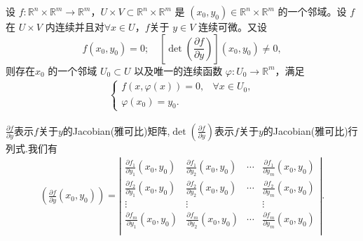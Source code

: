 \documentclass[../../main.tex]{subfiles}%
\begin{document}
\begin{theorem}[隐函数存在定理]\label{theorem:隐函数存在定理}
设 \( f : \mathbb{R}^n \times \mathbb{R}^m \to \mathbb{R}^m \)，\( U \times V \subset \mathbb{R}^n \times \mathbb{R}^m \) 是 \( (x_0, y_0) \in \mathbb{R}^n \times \mathbb{R}^m \) 的一个邻域。设 \( f \) 在 \( U \times V \) 内连续并且对\( \forall x \in U \)，$f$关于 \( y \in V \) 连续可微。又设
\[
f(x_0, y_0) = 0; \quad \left[ \det \left( \frac{\partial f}{\partial y} \right) \right] (x_0, y_0) \neq 0,
\]
则存在\( x_0 \) 的一个邻域 \( U_0 \subset U \) 以及唯一的连续函数 \( \varphi : U_0 \to \mathbb{R}^m \)，满足
\begin{align}\label{eq::hjr2389jr8jHSAIOUFh}
\begin{cases} 
f(x, \varphi(x)) = 0 ,&\forall x \in U_0, \\
\varphi(x_0) = y_0.
\end{cases}
\end{align}
\end{theorem}
\begin{remark}
$\frac{\partial f}{\partial y}$表示$f$关于$y$的Jacobian(雅可比)矩阵,$\det \left( \frac{\partial f}{\partial y} \right)$表示$f$关于$y$的Jacobian(雅可比)行列式.我们有
\begin{align*}
\left( \frac{\partial f}{\partial y}(x_0,y_0)\right) =\left| \begin{matrix}
\frac{\partial f_1}{\partial y_1}\left( x_0,y_0 \right)&		\frac{\partial f_1}{\partial y_2}\left( x_0,y_0 \right)&		\cdots&		\frac{\partial f_1}{\partial y_m}\left( x_0,y_0 \right)\\
\frac{\partial f_2}{\partial y_1}\left( x_0,y_0 \right)&		\frac{\partial f_2}{\partial y_2}\left( x_0,y_0 \right)&		\cdots&		\frac{\partial f_2}{\partial y_m}\left( x_0,y_0 \right)\\
\vdots&		\vdots&		&		\vdots\\
\frac{\partial f_m}{\partial y_1}\left( x_0,y_0 \right)&		\frac{\partial f_m}{\partial y_2}\left( x_0,y_0 \right)&		\cdots&		\frac{\partial f_m}{\partial y_m}\left( x_0,y_0 \right)\\
\end{matrix} \right| .
\end{align*}
\end{remark}
\end{document}
